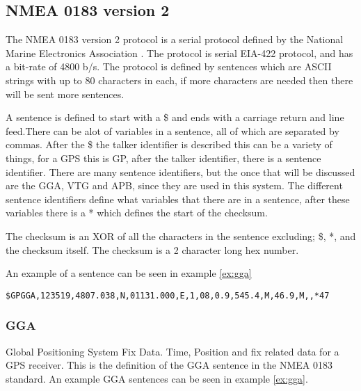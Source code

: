 \subsection{NMEA 0183 version 2}
The NMEA 0183 version 2 protocol is a serial protocol defined by the National Marine Electronics Association \cite{NMEA}. 
The protocol is serial EIA-422 protocol, and has a bit-rate of 4800 b/s. The protocol is defined by sentences which are ASCII strings with up to 80 characters in each, if more characters are needed then there will be sent more sentences. 

A sentence is defined to start with a \$ and ends with a carriage return and line feed.There can be alot of variables in a sentence, all of which are separated by commas. After the \$ the talker identifier is described this can be a variety of things, for a GPS this is GP, after the talker identifier, there is a sentence identifier. There are many sentence identifiers, but the once that will be discussed are the GGA, VTG and APB, since they are used in this system. The different sentence identifiers define what variables that there are in a sentence, after these variables there is a * which defines the start of the checksum.

The checksum is an XOR of all the characters in the sentence excluding; \$, *, and the checksum itself. The checksum is a 2 character long hex number.

An example of a sentence can be seen in example \ref{ex:gga}
\begin{ex}
\texttt{\$GPGGA,123519,4807.038,N,01131.000,E,1,08,0.9,545.4,M,46.9,M,,*47}
\label{ex:gga}
\end{ex}

\subsubsection{GGA}
Global Positioning System Fix Data. Time, Position and fix related data for a GPS receiver. This is the definition of the GGA sentence in the NMEA 0183 standard. An example GGA sentences can be seen in example \ref{ex:gga}.

